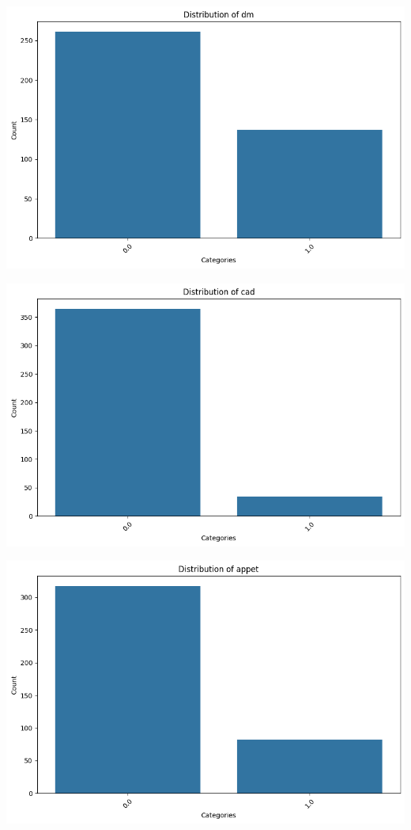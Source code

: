 \documentclass[
  11pt,
  letterpaper,
  DIV=11,
  numbers=noendperiod]{scrartcl}
\begin{document}
\includegraphics{Assignment6_Final version_files/figure-pdf/cell-15-output-6.png}

\includegraphics{Assignment6_Final version_files/figure-pdf/cell-15-output-7.png}

\includegraphics{Assignment6_Final version_files/figure-pdf/cell-15-output-8.png}
\end{document}
